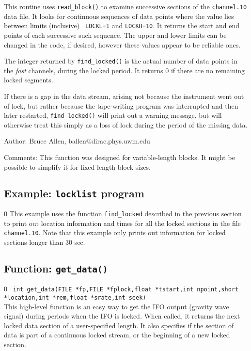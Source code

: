 This routine uses {\tt read\_block()} to examine successive sections of
the {\tt channel.10} data file.  It looks for continuous sequences of
data points where the value lies between limits (inclusive) {\tt
LOCKL=1} and {\tt LOCKH=10}.  It returns the start and end points of
each successive such sequence.  The upper and lower limits can be
changed in the code, if desired, however these values appear to be
reliable ones.

The integer returned by {\tt find\_locked()} is the actual number of
data points in the {\it fast} channels, during the locked period.  It
returns 0 if there are no remaining locked segments.

If there is a gap in the data stream, arising not because the
instrument went out of lock, but rather because the tape-writing
program was interrupted and then later restarted, {\tt find\_locked()}
will print out a warning message, but will otherwise treat this simply
as a loss of lock during the period of the missing data.

\begin{description}
\item{Author:}  Bruce Allen, ballen@dirac.phys.uwm.edu
\item{Comments:}  This function was designed for variable-length blocks.  It might
be possible to simplify it for fixed-length block sizes.
\end{description}
\clearpage

\subsection{Example: {\tt locklist} program}
\setcounter{equation}0
This example uses the function {\tt find\_locked} described in the
previous section to print out location information and times for all
the locked sections in the file {\tt channel.10}.  Note that this
example only prints out information for locked sections longer than 30
sec.

\clearpage

\subsection{Function: {\tt get\_data()}}
\label{subsec:get_data}
\setcounter{equation}0
{\tt 
int get\_data(FILE *fp,FILE *fplock,float *tstart,int npoint,short *location,int *rem,float *srate,int seek)
}\\
This high-level function is an easy way to get the IFO output (gravity
wave signal) during periods when the IFO is locked.  When called, it
returns the next locked data section of a user-specified length.  It
also specifies if the section of data is part of a continuous locked
stream, or the beginning of a new locked section.

